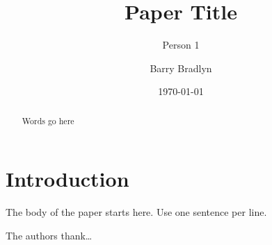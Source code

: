 \documentclass[prb,aps,amssymb,twocolumn,superscriptaddress,notitlepage]{revtex4-2}
\begin{document}
\title{Paper Title}
\author{Person 1}

\author{Barry Bradlyn}

\date{\today}

\begin{abstract}
Words go here
\end{abstract}
\maketitle

\section{Introduction}
The body of the paper starts here.
Use one sentence per line.

\begin{acknowledgments}
The authors thank\dots
\end{acknowledgments}



\end{document}
